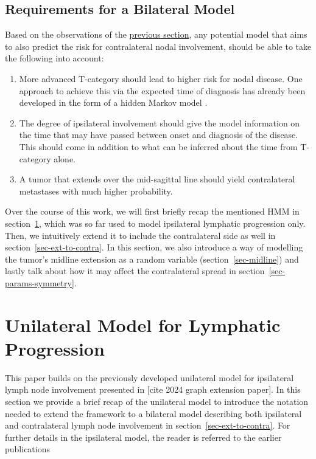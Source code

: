 \documentclass[
  sn-mathphys-num,
]{sn-jnl}
\providecommand{\tightlist}{%
  \setlength{\itemsep}{0pt}\setlength{\parskip}{0pt}}\usepackage{longtable,booktabs,array}
\begin{document}
\subsection{Requirements for a Bilateral Model}\label{sec-requirements}

Based on the observations of the \hyperref[sec-data-strat]{previous
section}, any potential model that aims to also predict the risk for
contralateral nodal involvement, should be able to take the following
into account:

\begin{enumerate}
\def\labelenumi{\arabic{enumi}.}
\tightlist
\item
  More advanced T-category should lead to higher risk for nodal disease.
  One approach to achieve this via the expected time of diagnosis has
  already been developed in the form of a hidden Markov model
  \citep{ludwig_hidden_2021}.
\item
  The degree of ipsilateral involvement should give the model
  information on the time that may have passed between onset and
  diagnosis of the disease. This should come in addition to what can be
  inferred about the time from T-category alone.
\item
  A tumor that extends over the mid-sagittal line should yield
  contralateral metastases with much higher probability.
\end{enumerate}

Over the course of this work, we will first briefly recap the mentioned
HMM in section~\ref{sec-unilateral}, which was so far used to model
ipsilateral lymphatic progression only. Then, we intuitively extend it
to include the contralateral side as well in
section~\ref{sec-ext-to-contra}. In this section, we also introduce a
way of modelling the tumor's midline extension as a random variable
(section~\ref{sec-midline}) and lastly talk about how it may affect the
contralateral spread in section~\ref{sec-params-symmetry}.

\section{Unilateral Model for Lymphatic
Progression}\label{sec-unilateral}

This paper builds on the previously developed unilateral model for
ipsilateral lymph node involvement presented in {[}cite 2024 graph
extension paper{]}. In this section we provide a brief recap of the
unilateral model to introduce the notation needed to extend the
framework to a bilateral model describing both ipsilateral and
contralateral lymph node involvement in section~\ref{sec-ext-to-contra}.
For further details in the ipsilateral model, the reader is referred to
the earlier publications \citep[cite 2024 graph extension
paper]{ludwig_hidden_2021}
\end{document}
